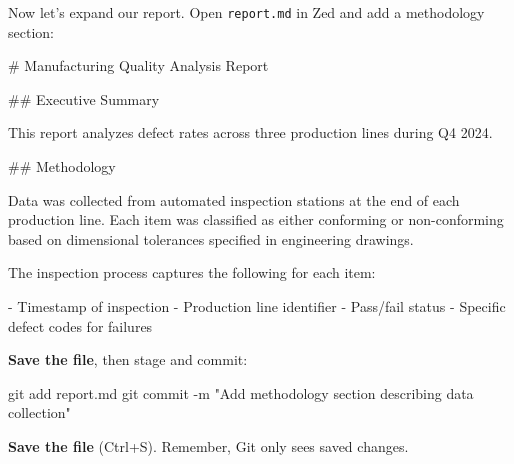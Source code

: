 \documentclass[
  letterpaper,
  DIV=11,
  numbers=noendperiod]{scrreprt}
\newenvironment{Shaded}{\begin{snugshade}}{\end{snugshade}}
\newcommand{\AttributeTok}[1]{\textcolor[rgb]{0.40,0.45,0.13}{#1}}
\newcommand{\FunctionTok}[1]{\textcolor[rgb]{0.28,0.35,0.67}{#1}}
\newcommand{\NormalTok}[1]{\textcolor[rgb]{0.00,0.23,0.31}{#1}}
\newcommand{\SpecialStringTok}[1]{\textcolor[rgb]{0.13,0.47,0.30}{#1}}
\newcommand{\StringTok}[1]{\textcolor[rgb]{0.13,0.47,0.30}{#1}}
\begin{document}
Now let's expand our report. Open \texttt{report.md} in Zed and add a
methodology section:

\begin{codelisting}

\caption{\texttt{report.md}}

\begin{Shaded}
\begin{Highlighting}[]
\FunctionTok{\# Manufacturing Quality Analysis Report}

\FunctionTok{\#\# Executive Summary}

\NormalTok{This report analyzes defect rates across three production lines}
\NormalTok{during Q4 2024.}

\FunctionTok{\#\# Methodology}

\NormalTok{Data was collected from automated inspection stations at the end of}
\NormalTok{each production line. Each item was classified as either conforming}
\NormalTok{or non{-}conforming based on dimensional tolerances specified in}
\NormalTok{engineering drawings.}

\NormalTok{The inspection process captures the following for each item:}

\SpecialStringTok{{-} }\NormalTok{Timestamp of inspection}
\SpecialStringTok{{-} }\NormalTok{Production line identifier}
\SpecialStringTok{{-} }\NormalTok{Pass/fail status}
\SpecialStringTok{{-} }\NormalTok{Specific defect codes for failures}
\end{Highlighting}
\end{Shaded}

\end{codelisting}

\textbf{Save the file}, then stage and commit:

\begin{codelisting}

\caption{\texttt{terminal}}

\begin{Shaded}
\begin{Highlighting}[]
\FunctionTok{git}\NormalTok{ add report.md}
\FunctionTok{git}\NormalTok{ commit }\AttributeTok{{-}m} \StringTok{"Add methodology section describing data collection"}
\end{Highlighting}
\end{Shaded}

\end{codelisting}

\textbf{Save the file} (Ctrl+S). Remember, Git only sees saved changes.
\end{document}
